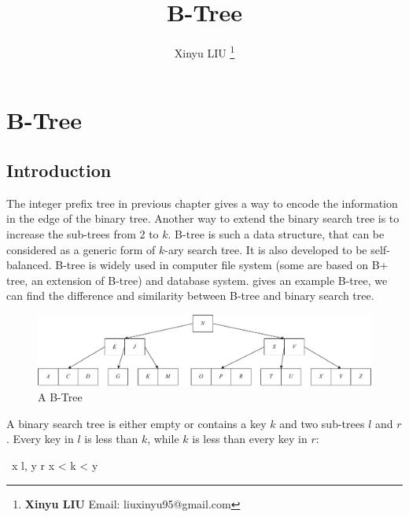 \documentclass[b5paper]{article}
\begin{document}
\title{B-Tree}

\author{Xinyu LIU
\thanks{{\bfseries Xinyu LIU} \newline
  Email: liuxinyu95@gmail.com \newline}
  }

\maketitle
\fi


\ifx\wholebook\relax
\chapter{B-Tree}
\fi

\section{Introduction}
\label{introduction}

The integer prefix tree in previous chapter gives a way to encode the information in the edge of the binary tree. Another way to extend the binary search tree is to increase the sub-trees from 2 to $k$. B-tree is such a data structure, that can be considered as a generic form of $k$-ary search tree. It is also developed to be self-balanced\cite{wiki-b-tree}. B-tree is widely used in computer file system (some are based on B+ tree, an extension of B-tree) and database system.  gives an example B-tree, we can find the difference and similarity between B-tree and binary search tree.

\begin{figure}[htbp]
  \centering
  \includegraphics[scale=0.33]{img/btree-del-before}
  \caption{A B-Tree}
  \label{fig:btree-example}
\end{figure}

A binary search tree is either empty or contains a key $k$ and two sub-trees $l$ and $r$. Every key in $l$ is less than $k$, while $k$ is less than every key in $r$:

\be
\forall\ x \in l, y \in r \Rightarrow x < k < y
\ee
\end{document}
